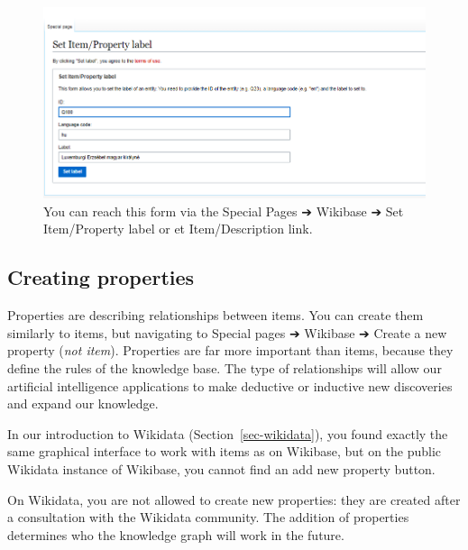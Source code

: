 \documentclass[
  letterpaper,
  DIV=11,
  numbers=noendperiod]{scrreprt}
\begin{document}
\begin{figure}[H]

{\centering \includegraphics{png/wikibase/edit/add_new_language_label.png}

}

\caption{You can reach this form via the Special Pages ➔ Wikibase ➔ Set
Item/Property label or et Item/Description link.}

\end{figure}%

\subsection{Creating properties}\label{creating-properties}

Properties are describing relationships between items. You can create
them similarly to items, but navigating to Special pages ➔ Wikibase ➔
Create a new property (\emph{not item}). Properties are far more
important than items, because they define the rules of the knowledge
base. The type of relationships will allow our artificial intelligence
applications to make deductive or inductive new discoveries and expand
our knowledge.

In our introduction to Wikidata (Section~\ref{sec-wikidata}), you found
exactly the same graphical interface to work with items as on Wikibase,
but on the public Wikidata instance of Wikibase, you cannot find an add
new property button.

\begin{tcolorbox}[enhanced jigsaw, opacityback=0, bottomrule=.15mm, rightrule=.15mm, toptitle=1mm, breakable, colbacktitle=quarto-callout-note-color!10!white, colback=white, title=\textcolor{quarto-callout-note-color}{\faInfo}\hspace{0.5em}{Note}, leftrule=.75mm, toprule=.15mm, left=2mm, arc=.35mm, colframe=quarto-callout-note-color-frame, coltitle=black, titlerule=0mm, bottomtitle=1mm, opacitybacktitle=0.6]

On Wikidata, you are not allowed to create new properties: they are
created after a consultation with the Wikidata community. The addition
of properties determines who the knowledge graph will work in the
future.

\end{tcolorbox}
\end{document}
